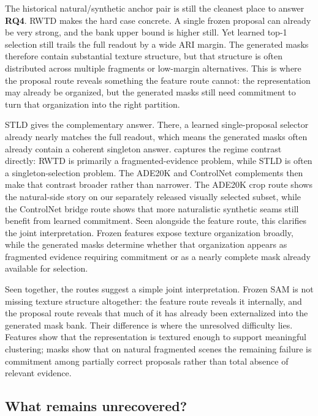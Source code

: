 The historical natural/synthetic anchor pair is still the cleanest place to answer \textbf{RQ4}. RWTD makes the hard case concrete. A single frozen proposal can already be very strong, and the bank upper bound is higher still. Yet learned top-1 selection still trails the full readout by a wide ARI margin. The generated masks therefore contain substantial texture structure, but that structure is often distributed across multiple fragments or low-margin alternatives. This is where the proposal route reveals something the feature route cannot: the representation may already be organized, but the generated masks still need commitment to turn that organization into the right partition.

STLD gives the complementary answer. There, a learned single-proposal selector already nearly matches the full readout, which means the generated masks often already contain a coherent singleton answer.  captures the regime contrast directly: RWTD is primarily a fragmented-evidence problem, while STLD is often a singleton-selection problem. The ADE20K and ControlNet complements then make that contrast broader rather than narrower. The ADE20K crop route shows the natural-side story on our separately released visually selected subset, while the ControlNet bridge route shows that more naturalistic synthetic seams still benefit from learned commitment. Seen alongside the feature route, this clarifies the joint interpretation. Frozen features expose texture organization broadly, while the generated masks determine whether that organization appears as fragmented evidence requiring commitment or as a nearly complete mask already available for selection.



Seen together, the routes suggest a simple joint interpretation. Frozen SAM is not missing texture structure altogether: the feature route reveals it internally, and the proposal route reveals that much of it has already been externalized into the generated mask bank. Their difference is where the unresolved difficulty lies. Features show that the representation is textured enough to support meaningful clustering; masks show that on natural fragmented scenes the remaining failure is commitment among partially correct proposals rather than total absence of relevant evidence.

\subsection{What remains unrecovered?}


